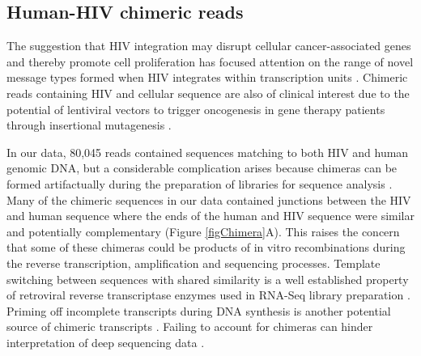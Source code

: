 \documentclass[../sherrill-Mix_thesis.tex]{subfiles}
\begin{document}
	\subsection{Human-HIV chimeric reads} %
		The suggestion that HIV integration may disrupt cellular cancer-associated genes and thereby promote cell proliferation \citep{Ikeda2007,Wagner2014,Maldarelli2014,Cohn2015} has focused attention on the range of novel message types formed when HIV integrates within transcription units \citep{Schroder2002,Wang2007,Brady2009,Sherrill-Mix2013,Marini2015}. Chimeric reads containing HIV and cellular sequence are also of clinical interest due to the potential of lentiviral vectors to trigger oncogenesis in gene therapy patients through insertional mutagenesis \citep{Cavazzana-Calvo2010,Hacein-Bey-Abina2008,Moiani2012,Cesana2012}. 
		
		In our data, 80,045 reads contained sequences matching to both HIV and human genomic DNA, but a considerable complication arises because chimeras can be formed artifactually during the preparation of libraries for sequence analysis \citep{Paeaebo1990,Odelberg1995,Zeng2002,Tasic2002,Geiszt2004,Cocquet2006,McManus2010,Cogne2014}. Many of the chimeric sequences in our data contained junctions between the HIV and human sequence where the ends of the human and HIV sequence were similar and potentially complementary (Figure \ref{figChimera}A). This raises the concern that some of these chimeras could be products of in vitro recombinations during the reverse transcription, amplification and sequencing processes. Template switching between sequences with shared similarity is a well established property of retroviral reverse transcriptase enzymes used in RNA-Seq library preparation \citep{Gilboa1979,Luo1990,Houseley2010}. Priming off incomplete transcripts during DNA synthesis is another potential source of chimeric transcripts \citep{Paeaebo1990,Meyerhans1990,Odelberg1995,Lahr2009}. Failing to account for chimeras can hinder interpretation of deep sequencing data \citep{Zeng2002,Tasic2002,Geiszt2004,Cocquet2006,McManus2010,Cogne2014}.
\end{document}
